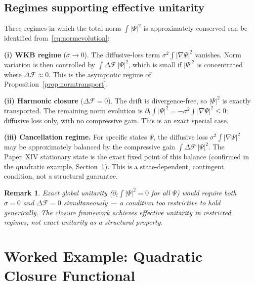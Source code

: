 \documentclass[12pt]{article}
\newtheorem{remark}[theorem]{Remark}
\newcommand{\Fcal}{\mathcal{F}}
\begin{document}
\subsection*{Regimes supporting effective unitarity}

Three regimes in which the total norm $\int|\Psi|^2$ is approximately conserved can be identified from~\eqref{eq:normevolution}:

\textbf{(i) WKB regime} ($\sigma \to 0$). The diffusive-loss term $\sigma^2 \int |\nabla\Psi|^2$ vanishes. Norm variation is then controlled by $\int \Delta\Fcal\, |\Psi|^2$, which is small if $|\Psi|^2$ is concentrated where $\Delta\Fcal \approx 0$. This is the asymptotic regime of Proposition~\ref{prop:normtransport}.

\textbf{(ii) Harmonic closure} ($\Delta\Fcal = 0$). The drift is divergence-free, so $|\Psi|^2$ is exactly transported. The remaining norm evolution is $\partial_t \int |\Psi|^2 = -\sigma^2 \int |\nabla\Psi|^2 \leq 0$: diffusive loss only, with no compressive gain. This is an exact special case.

\textbf{(iii) Cancellation regime.} For specific states $\Psi$, the diffusive loss $\sigma^2 \int |\nabla\Psi|^2$ may be approximately balanced by the compressive gain $\int \Delta\Fcal\, |\Psi|^2$. The Paper~XIV stationary state is the exact fixed point of this balance (confirmed in the quadratic example, Section~\ref{sec:example}). This is a state-dependent, contingent condition, not a structural guarantee.

\begin{remark}
Exact global unitarity ($\partial_t \int |\Psi|^2 = 0$ for all $\Psi$) would require both $\sigma = 0$ and $\Delta\Fcal = 0$ simultaneously --- a condition too restrictive to hold generically. The closure framework achieves effective unitarity in restricted regimes, not exact unitarity as a structural property.
\end{remark}

\section{Worked Example: Quadratic Closure Functional}\label{sec:example}
\end{document}
